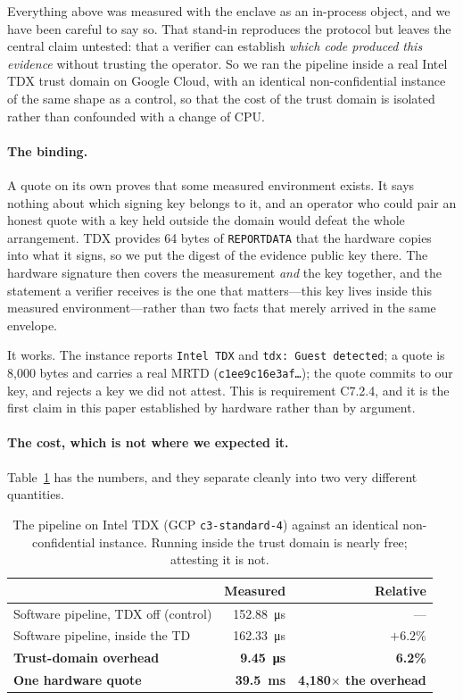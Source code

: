 \documentclass[11pt]{article}
\begin{document}
Everything above was measured with the enclave as an in-process object, and we
have been careful to say so. That stand-in reproduces the protocol but leaves
the central claim untested: that a verifier can establish \emph{which code
produced this evidence} without trusting the operator. So we ran the pipeline
inside a real Intel TDX trust domain on Google Cloud, with an identical
non-confidential instance of the same shape as a control, so that the cost of
the trust domain is isolated rather than confounded with a change of CPU.

\paragraph{The binding.} A quote on its own proves that some measured
environment exists. It says nothing about which signing key belongs to it, and
an operator who could pair an honest quote with a key held outside the domain
would defeat the whole arrangement. TDX provides 64 bytes of
\texttt{REPORTDATA} that the hardware copies into what it signs, so we put the
digest of the evidence public key there. The hardware signature then covers the
measurement \emph{and} the key together, and the statement a verifier receives
is the one that matters---this key lives inside this measured
environment---rather than two facts that merely arrived in the same envelope.

It works. The instance reports \texttt{Intel TDX} and \texttt{tdx: Guest
detected}; a quote is 8{,}000 bytes and carries a real
MRTD (\texttt{c1ee9c16e3af\ldots}); the quote commits to our key, and rejects a
key we did not attest. This is requirement C7.2.4, and it is the first claim in
this paper established by hardware rather than by argument.

\paragraph{The cost, which is not where we expected it.}
Table~\ref{tab:tdx} has the numbers, and they separate cleanly into two very
different quantities.

\begin{table}[ht]
\centering\small
\begin{tabular}{@{}lrr@{}}
\toprule
& \textbf{Measured} & \textbf{Relative} \\
\midrule
Software pipeline, TDX off (control) & \SI{152.88}{\micro\second} & --- \\
Software pipeline, inside the TD & \SI{162.33}{\micro\second} & $+6.2\%$ \\
\midrule
\textbf{Trust-domain overhead} & \textbf{\SI{9.45}{\micro\second}} & \textbf{6.2\%} \\
\textbf{One hardware quote} & \textbf{\SI{39.5}{\milli\second}} & \textbf{4{,}180$\times$ the overhead} \\
\bottomrule
\end{tabular}
\caption{The pipeline on Intel TDX (GCP \texttt{c3-standard-4}) against an
identical non-confidential instance. Running inside the trust domain is nearly
free; attesting it is not.}
\label{tab:tdx}
\end{table}
\end{document}
